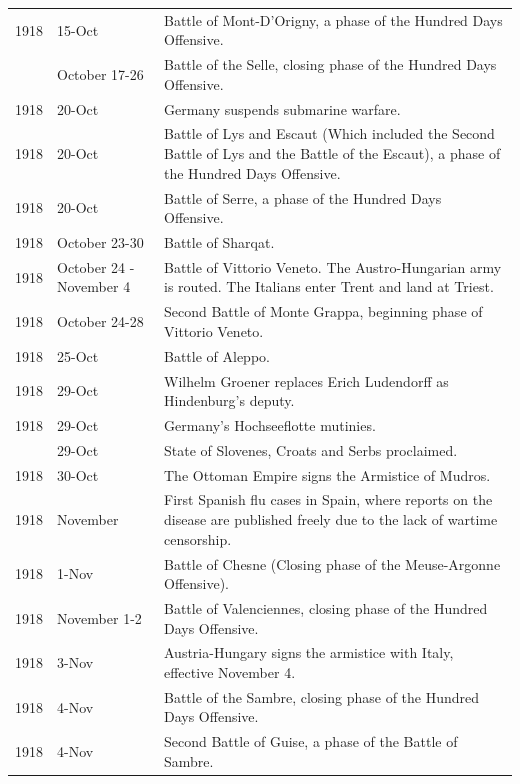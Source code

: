 \documentclass[
  openany]{book}
\begin{document}
\begin{longtable}[t]{rl>{\raggedright\arraybackslash}p{22em}}
\rowcolor{gray!6}  1918 & 15-Oct & Battle of Mont-D'Origny, a phase of the Hundred Days Offensive.\\
\addlinespace
1918 & October 17-26 & Battle of the Selle, closing phase of the Hundred Days Offensive.\\
\rowcolor{gray!6}  1918 & 20-Oct & Germany suspends submarine warfare.\\
1918 & 20-Oct & Battle of Lys and Escaut (Which included the Second Battle of Lys and the Battle of the Escaut), a phase of the Hundred Days Offensive.\\
\rowcolor{gray!6}  1918 & 20-Oct & Battle of Serre, a phase of the Hundred Days Offensive.\\
1918 & October 23-30 & Battle of Sharqat.\\
\addlinespace
\rowcolor{gray!6}  1918 & October 24 - November 4 & Battle of Vittorio Veneto. The Austro-Hungarian army is routed. The Italians enter Trent and land at Triest.\\
1918 & October 24-28 & Second Battle of Monte Grappa, beginning phase of Vittorio Veneto.\\
\rowcolor{gray!6}  1918 & 25-Oct & Battle of Aleppo.\\
1918 & 29-Oct & Wilhelm Groener replaces Erich Ludendorff as Hindenburg's deputy.\\
\rowcolor{gray!6}  1918 & 29-Oct & Germany's Hochseeflotte mutinies.\\
\addlinespace
1918 & 29-Oct & State of Slovenes, Croats and Serbs proclaimed.\\
\rowcolor{gray!6}  1918 & 30-Oct & The Ottoman Empire signs the Armistice of Mudros.\\
1918 & November & First Spanish flu cases in Spain, where reports on the disease are published freely due to the lack of wartime censorship.\\
\rowcolor{gray!6}  1918 & 1-Nov & Battle of Chesne (Closing phase of the Meuse-Argonne Offensive).\\
1918 & November 1-2 & Battle of Valenciennes, closing phase of the Hundred Days Offensive.\\
\addlinespace
\rowcolor{gray!6}  1918 & 3-Nov & Austria-Hungary signs the armistice with Italy, effective November 4.\\
1918 & 4-Nov & Battle of the Sambre, closing phase of the Hundred Days Offensive.\\
\rowcolor{gray!6}  1918 & 4-Nov & Second Battle of Guise, a phase of the Battle of Sambre.\\

\end{longtable}
\end{document}
